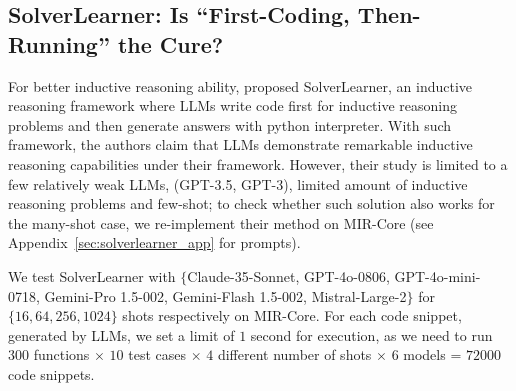 \label{sec:robust}



\subsection{SolverLearner: Is ``First-Coding, Then-Running'' the Cure?}
\label{sec:coding}

For better inductive reasoning ability, \citet{cheng2024inductive} proposed SolverLearner, an inductive reasoning framework where LLMs write code first for inductive reasoning problems and then generate answers with python interpreter. With such framework, the authors claim that LLMs demonstrate remarkable
inductive reasoning capabilities under their framework. However, their study is limited to a few relatively weak LLMs, (GPT-3.5, GPT-3), limited amount of inductive reasoning problems and few-shot; to check whether such solution also works for the many-shot case, we re-implement their method on MIR-Core (see Appendix~\ref{sec:solverlearner_app} for prompts).

We test SolverLearner with $\{$Claude-35-Sonnet, GPT-4o-0806, GPT-4o-mini-0718, Gemini-Pro 1.5-002, Gemini-Flash 1.5-002, Mistral-Large-2$\}$ for $\{16, 64, 256, 1024\}$ shots respectively on MIR-Core. For each code snippet, generated by LLMs, we set a limit of $1$ second for execution, as we need to run $300$ functions $\times$ $10$ test cases $\times$ $4$ different number of shots $\times$ $6$ models = $72000$ code snippets. 

